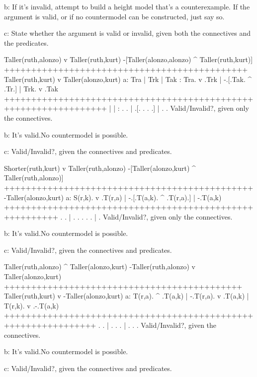 b: If it's invalid, attempt to build a height model that's a counterexample. If the argument is valid, or if no countermodel can be constructed, just say so.

c: State whether the argument is valid or invalid, given both the connectives and the predicates.
\endlist

\problems
{}
\argument
 Taller(ruth,alonzo) v Taller(ruth,kurt)
 -[Taller(alonzo,alonzo) ^ Taller(ruth,kurt)]
+++++++++++++++++++++++++++++++++++++++++++++
 Taller(ruth,kurt) v Taller(alonzo,kurt)
\endargument
        \answerlist
        a:
        \truthtable
         Tra | Trk | Tak : Tra. v .Trk | -.[.Tak. ^ .Tr.] | Trk. v .Tak
        +++++++++++++++++++++++++++++++++++++++++++++++++++++++++++++++++
             |     |     :    .   .    |  .[.   .   .  .] |    .   .   
        \endtruthtable
        Valid/Invalid?, given only the connectives.

        b: It's valid.\OR No countermodel is possible.\OR
        \heightmodel
        
        \endheightmodel

        c: Valid/Invalid?, given the connectives and predicates.
        \endanswerlist

\argument
 Shorter(ruth,kurt) v Taller(ruth,alonzo)
 -[Taller(alonzo,kurt) ^ Taller(ruth,alonzo)]
++++++++++++++++++++++++++++++++++++++++++++++
 -Taller(alonzo,kurt)
\endargument
        \answerlist
        a:
        \truthtable
         S(r,k). v .T(r,a) | -.[.T(a,k). ^ .T(r,a).] | -.T(a,k)
        ++++++++++++++++++++++++++++++++++++++++++++++++++++++++
               .   .       |  . .      .   .      .  |  .
        \endtruthtable
        Valid/Invalid?, given only the connectives.

        b: It's valid.\OR No countermodel is possible.\OR
        \heightmodel
         
        \endheightmodel

        c: Valid/Invalid?, given the connectives and predicates.
        \endanswerlist

\argument
 Taller(ruth,alonzo) ^ Taller(alonzo,kurt)
 -Taller(ruth,alonzo) v Taller(alonzo,kurt)
++++++++++++++++++++++++++++++++++++++++++++
 Taller(ruth,kurt) v -Taller(alonzo,kurt) 
\endargument
        \answerlist
        a:
        \truthtable
         T(r,a). ^ .T(a,k) | -.T(r,a). v .T(a,k) | T(r,k). v .-.T(a,k)
        +++++++++++++++++++++++++++++++++++++++++++++++++++++++++++++++
               .   .       |  .      .   .       |       .   . .
        \endtruthtable
        Valid/Invalid?, given the connectives.

        b: It's valid.\OR No countermodel is possible.\OR
        \heightmodel
         
        \endheightmodel

        c: Valid/Invalid?, given the connectives and predicates.
        \endanswerlist

\endproblems
\bye
